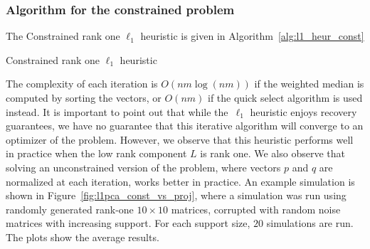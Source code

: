 \subsubsection{Algorithm for the constrained problem} 
The Constrained rank one $\ell_1$ heuristic is given in Algorithm~\ref{alg:l1_heur_const}
\begin{algorithm}[h]
\caption{Constrained rank one $\ell_1$ heuristic}
\label{alg:l1_heur_const}
\end{algorithm}

The complexity of each iteration is $O(nm\log (nm))$ if the weighted median is computed by sorting the vectors, or $O(nm)$ if the quick select algorithm is used instead. 
It is important to point out that while the~$\ell_1$ heuristic enjoys recovery guarantees, we have no guarantee that this iterative algorithm will converge to an optimizer of the problem. However, we observe that this heuristic performs well in practice when the low rank component $L$ is rank one. We also observe that solving an unconstrained version of the problem, where vectors $p$ and $q$ are normalized at each iteration, works better in practice. An example simulation is shown in Figure~\ref{fig:l1pca_const_vs_proj}, where a simulation was run using randomly generated rank-one $10 \times 10$ matrices, corrupted with random noise matrices with increasing support. For each support size, $20$ simulations are run. The plots show the average results.


